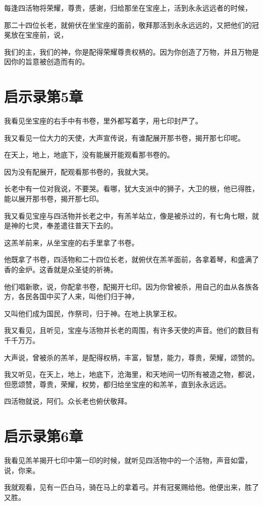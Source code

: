 \documentclass[12pt,oneside]{book}
\begin{document}
每逢四活物将荣耀，尊贵，感谢，归给那坐在宝座上，活到永永远远者的时候，

那二十四位长老，就俯伏在坐宝座的面前，敬拜那活到永永远远的，又把他们的冠冕放在宝座前，说，

我们的主，我们的神，你是配得荣耀尊贵权柄的。因为你创造了万物，并且万物是因你的旨意被创造而有的。

\chapter{启示录第5章}
我看见坐宝座的右手中有书卷，里外都写着字，用七印封严了。

我又看见一位大力的天使，大声宣传说，有谁配展开那书卷，揭开那七印呢。

在天上，地上，地底下，没有能展开能观看那书卷的。

因为没有配展开，配观看那书卷的，我就大哭。

长老中有一位对我说，不要哭。看哪，犹大支派中的狮子，大卫的根，他已得胜，能以展开那书卷，揭开那七印。

我又看见宝座与四活物并长老之中，有羔羊站立，像是被杀过的，有七角七眼，就是神的七灵，奉差遣往普天下去的。

这羔羊前来，从坐宝座的右手里拿了书卷。

他既拿了书卷，四活物和二十四位长老，就俯伏在羔羊面前，各拿着琴，和盛满了香的金炉。这香就是众圣徒的祈祷。

他们唱新歌，说，你配拿书卷，配揭开七印。因为你曾被杀，用自己的血从各族各方，各民各国中买了人来，叫他们归于神，

又叫他们成为国民，作祭司，归于神。在地上执掌王权。

我又看见，且听见，宝座与活物并长老的周围，有许多天使的声音。他们的数目有千千万万。

大声说，曾被杀的羔羊，是配得权柄，丰富，智慧，能力，尊贵，荣耀，颂赞的。

我又听见，在天上，地上，地底下，沧海里，和天地间一切所有被造之物，都说，但愿颂赞，尊贵，荣耀，权势，都归给坐宝座的和羔羊，直到永永远远。

四活物就说，阿们。众长老也俯伏敬拜。

\chapter{启示录第6章}
我看见羔羊揭开七印中第一印的时候，就听见四活物中的一个活物，声音如雷，说，你来。

我就观看，见有一匹白马，骑在马上的拿着弓。并有冠冕赐给他。他便出来，胜了又胜。
\end{document}
